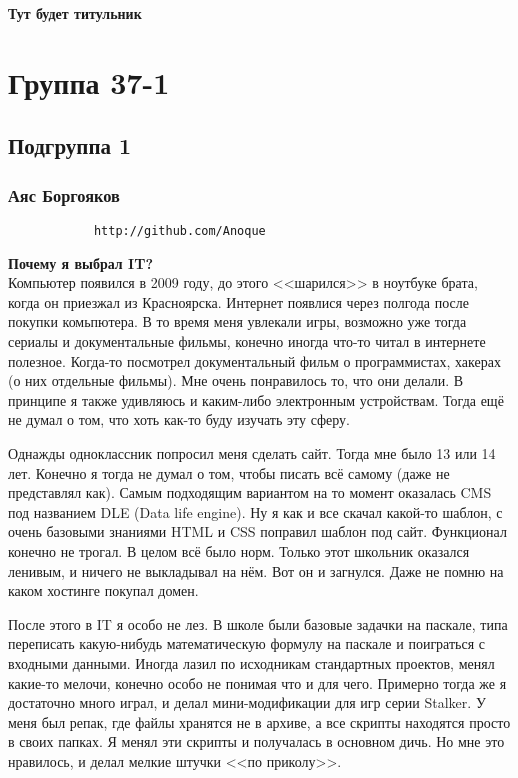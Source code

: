 \documentclass[14pt,a4paper,oneside]{extbook}
\begin{document}
	\begin{titlepage}
		\Huge{\textbf{Тут будет титульник}}
	\end{titlepage}
	\clearpage
	\setcounter{page}{2}

	\tableofcontents
	
	\chapter{Группа 37-1}
		\section{Подгруппа 1}
		
		\subsection{Аяс Боргояков}
		\begin{verbatim}
			http://github.com/Anoque
		\end{verbatim}
		
		\noindent\textbf{Почему я выбрал IT?}\\		
		
		Компьютер появился в 2009 году, до этого <<шарился>> в ноутбуке брата, когда он приезжал из Красноярска. Интернет появлися через полгода после покупки комьпютера.		В то время меня увлекали игры, возможно уже тогда сериалы и документальные фильмы, конечно иногда что-то читал в интернете полезное. Когда-то посмотрел документальный фильм о программистах, хакерах (о них отдельные фильмы). Мне очень понравилось то, что они делали. В принципе я также удивляюсь и каким-либо электронным устройствам. Тогда ещё не думал о том, что хоть как-то буду изучать эту сферу.
		
		Однажды одноклассник попросил меня сделать сайт. Тогда мне было 13 или 14 лет. Конечно я тогда не думал о том, чтобы писать всё самому (даже не представлял как). Самым подходящим вариантом на то момент оказалась CMS под названием DLE (Data life engine). Ну я как и все скачал какой-то шаблон, с очень базовыми знаниями HTML и CSS поправил шаблон под сайт. Функционал конечно не трогал. В целом всё было норм. Только этот школьник оказался ленивым, и ничего не выкладывал на нём. Вот он и загнулся. Даже не помню на каком хостинге покупал домен.
		
		После этого в IT я особо не лез. В школе были базовые задачки на паскале, типа переписать какую-нибудь математическую формулу на паскале и поиграться с входными данными. Иногда лазил по исходникам стандартных проектов, менял какие-то мелочи, конечно особо не понимая что и для чего. Примерно тогда же я достаточно много играл, и делал мини-модификации для игр серии Stalker. У меня был репак, где файлы хранятся не в архиве, а все скрипты находятся просто в своих папках. Я менял эти скрипты и получалась в основном дичь. Но мне это нравилось, и делал мелкие штучки <<по приколу>>. 
		
\end{document}
